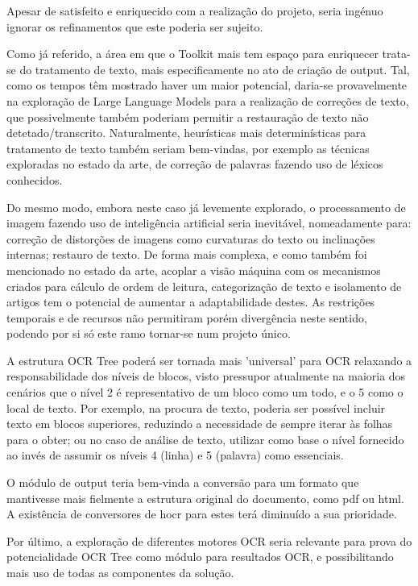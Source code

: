 Apesar de satisfeito e enriquecido com a realização do projeto, seria ingénuo ignorar os refinamentos que este poderia ser sujeito. 

Como já referido, a área em que o Toolkit mais tem espaço para enriquecer trata-se do tratamento de texto, mais especificamente no ato de criação de output. Tal, como os tempos têm mostrado haver um maior potencial, daria-se provavelmente na exploração de Large Language Models para a realização de correções de texto, que possivelmente também poderiam permitir a restauração de texto não detetado/transcrito. Naturalmente, heurísticas mais determinísticas para tratamento de texto também seriam bem-vindas, por exemplo as técnicas exploradas no estado da arte, de correção de palavras fazendo uso de léxicos conhecidos.

Do mesmo modo, embora neste caso já levemente explorado, o processamento de imagem fazendo uso de inteligência artificial seria inevitável, nomeadamente para: correção de distorções de imagens como curvaturas do texto ou inclinações internas; restauro de texto. De forma mais complexa, e como também foi mencionado no estado da arte, acoplar a visão máquina com os mecanismos criados para cálculo de ordem de leitura, categorização de texto e isolamento de artigos tem o potencial de aumentar a adaptabilidade destes. As restrições temporais e de recursos não permitiram porém divergência neste sentido, podendo por si só este ramo tornar-se num projeto único.

A estrutura OCR Tree poderá ser tornada mais 'universal' para OCR relaxando a responsabilidade dos níveis de blocos, visto pressupor atualmente na maioria dos cenários que o nível 2 é representativo de um bloco como um todo, e o 5 como o local de texto. Por exemplo, na procura de texto, poderia ser possível incluir texto em blocos superiores, reduzindo a necessidade de sempre iterar às folhas para o obter; ou no caso de análise de texto, utilizar como base o nível fornecido ao invés de assumir os níveis 4 (linha) e 5 (palavra) como essenciais.

O módulo de output teria bem-vinda a conversão para um formato que mantivesse mais fielmente a estrutura original do documento, como pdf ou html. A existência de conversores de hocr para estes terá diminuído a sua prioridade.


Por último, a exploração de diferentes motores OCR seria relevante para prova do potencialidade OCR Tree como módulo para resultados OCR, e possibilitando mais uso de todas as componentes da solução.


		